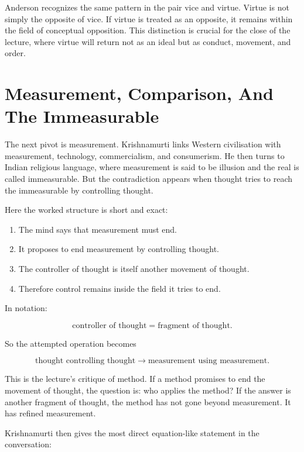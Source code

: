 Anderson recognizes the same pattern in the pair vice and virtue. Virtue is not simply the opposite of vice. If virtue is treated as an opposite, it remains within the field of conceptual opposition. This distinction is crucial for the close of the lecture, where virtue will return not as an ideal but as conduct, movement, and order.

\section{Measurement, Comparison, And The Immeasurable}

The next pivot is measurement. Krishnamurti links Western civilisation with measurement, technology, commercialism, and consumerism. He then turns to Indian religious language, where measurement is said to be illusion and the real is called immeasurable. But the contradiction appears when thought tries to reach the immeasurable by controlling thought.

Here the worked structure is short and exact:

\begin{enumerate}
\item The mind says that measurement must end.
\item It proposes to end measurement by controlling thought.
\item The controller of thought is itself another movement of thought.
\item Therefore control remains inside the field it tries to end.
\end{enumerate}

In notation:

\begin{equation}
\text{controller of thought}
=
\text{fragment of thought}.
\end{equation}

So the attempted operation becomes

\begin{equation}
\text{thought controlling thought}
\longrightarrow
\text{measurement using measurement}.
\end{equation}

This is the lecture's critique of method. If a method promises to end the movement of thought, the question is: who applies the method? If the answer is another fragment of thought, the method has not gone beyond measurement. It has refined measurement.

Krishnamurti then gives the most direct equation-like statement in the conversation:

